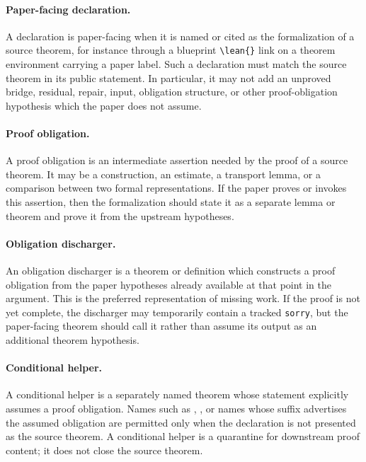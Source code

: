 \documentclass[11pt]{article}
\begin{document}
\paragraph{Paper-facing declaration.}
A \Lean{} declaration is paper-facing when it is named or cited as the
formalization of a source theorem, for instance through a blueprint
\verb|\lean{}| link on a theorem environment carrying a paper label.  Such a
declaration must match the source theorem in its public statement.  In
particular, it may not add an unproved bridge, residual, repair, input,
obligation structure, or other proof-obligation hypothesis which the paper does
not assume.

\paragraph{Proof obligation.}
A proof obligation is an intermediate assertion needed by the proof of a source
theorem.  It may be a construction, an estimate, a transport lemma, or a
comparison between two formal representations.  If the paper proves or invokes
this assertion, then the formalization should state it as a separate lemma or
theorem and prove it from the upstream hypotheses.

\paragraph{Obligation discharger.}
An obligation discharger is a theorem or definition which constructs a proof
obligation from the paper hypotheses already available at that point in the
argument.  This is the preferred representation of missing work.  If the proof
is not yet complete, the discharger may temporarily contain a tracked
\verb|sorry|, but the paper-facing theorem should call it rather than assume
its output as an additional theorem hypothesis.

\paragraph{Conditional helper.}
A conditional helper is a separately named theorem whose statement explicitly
assumes a proof obligation.  Names such as
,
, or names whose suffix advertises the
assumed obligation are permitted only when the declaration is not presented as
the source theorem.  A conditional helper is a quarantine for downstream proof
content; it does not close the source theorem.
\end{document}
